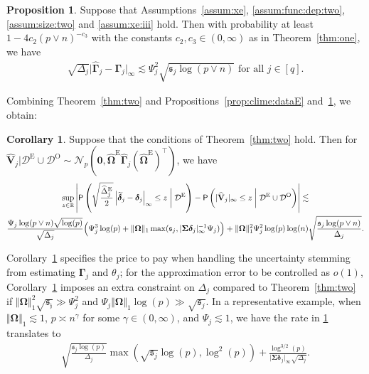\documentclass[11pt, a4paper]{article}
\newcommand{\mbf}{\mathbf}
\newcommand{\mc}{\mathcal}
\renewcommand{\l}{\left}
\renewcommand{\r}{\right}
\def\wh{\widehat}
\def\wc{\widetilde}
\newcommand{\cp}{\theta}
\newcommand{\p}{\mathsf{P}}
\newcommand{\R}{\mathbb{R}}
\newcommand{\tE}{\text{E}}
\newcommand{\tO}{\text{O}}
\theoremstyle{definition}
\theoremstyle{definition}
\newtheorem{cor}[thm]{Corollary}
\theoremstyle{definition}
\theoremstyle{definition}
\newtheorem{prop}[thm]{Proposition}
\theoremstyle{definition}
\theoremstyle{remark}
\theoremstyle{definition}
\theoremstyle{definition}
\theoremstyle{definition}
\begin{document}
\begin{prop}
	\label{prop:G}
	Suppose that Assumptions~\ref{assum:xe}, \ref{assum:func:dep:two}, \ref{assum:size:two} and \ref{assum:xe:iii} hold.
	Then with probability at least $1 - 4 c_2 (p \vee n)^{-c_3}$ with the constants $c_2, c_3 \in (0, \infty)$ as in Theorem~\ref{thm:one}, we have 
	\begin{align*}
	\sqrt{\Delta_j} \vert \wh{\bm\Gamma}_j - \bm\Gamma_j \vert_\infty 
	\lesssim \Psi_j^2 \sqrt{\mathfrak{s}_j \log(p \vee n)} \text{ \ for all \ } j \in [q].
	\end{align*}
\end{prop}

Combining Theorem~\ref{thm:two} and Propositions~\ref{prop:clime:dataE} and~\ref{prop:G}, we obtain: 
\begin{cor}	\label{cor:thm:two} Suppose that the conditions of Theorem~\ref{thm:two} hold. 
Then for $\wh{\mbf V}_j \vert \mc D^{\tE} \cup \mc D^{\tO} \sim \mc N_p(\mbf 0, \wh{\bm\Omega}^{\tE} \wh{\bm\Gamma}_j (\wh{\bm\Omega}^{\tE})^\top)$, we have 
\begin{multline*}
\sup_{z \in \R} \l\vert \p\l( \sqrt{\frac{\wh\Delta^{\tE}_j}{2}} \l\vert \wc{\bm\delta}_j - \bm\delta_j \r\vert_\infty \le z \;\bigg\vert\; \mc D^{\tE} \r) - \p\l(\vert \wh{\mbf V}_j \vert_\infty \le z \;\bigg\vert\; \mc D^{\tE} \cup \mc D^{\tO} \r) \r\vert 
\lesssim \\\frac{\Psi_j \log(p \vee n) \sqrt{\log(p)}}{\sqrt{\Delta_j}} \Bigl( \Psi_j^3 \log(p) + \Vert \bm\Omega \Vert_1 \max(\mathfrak{s}_j, \vert \bm\Sigma \bm\delta_j \vert_\infty^{-1} \Psi_j) \Bigr) 
+ \Vert \bm\Omega \Vert_1^2 \Psi_j^2 \log(p)\log(n) \sqrt{\frac{\mathfrak{s}_j \log(p \vee n)}{\Delta_j}}.
\end{multline*}
\end{cor}

Corollary~\ref{cor:thm:two} specifies the price to pay when handling the uncertainty stemming from estimating  $\bm\Gamma_j$ and $\cp_j$;
for the approximation error to be controlled as $o(1)$, Corollary~\ref{cor:thm:two} imposes an extra constraint on $\Delta_j$ compared to Theorem~\ref{thm:two} if $\Vert \bm\Omega \Vert_1^2 \sqrt{\mathfrak{s_j}} \gg \Psi_j^2$ and $\Psi_j \Vert \bm\Omega \Vert_1 \log(p) \gg \sqrt{\mathfrak{s}_j}$.
In a representative example, when $\Vert \bm\Omega \Vert_1 \lesssim 1$, $p \asymp n^\gamma$ for some $\gamma \in (0, \infty)$, and $\Psi_j \lesssim 1$, we have the rate in \cref{cor:thm:two} translates to
\begin{align*}
\sqrt{\frac{\mathfrak{s}_j \log(p)}{\Delta_j}} \max\l( \sqrt{\mathfrak{s}_j} \log(p), \log^2(p) \r) + \frac{\log^{3/2}(p)}{\vert \bm\Sigma \bm\delta_j \vert_\infty \sqrt{\Delta_j}}.
\end{align*}
\end{document}
